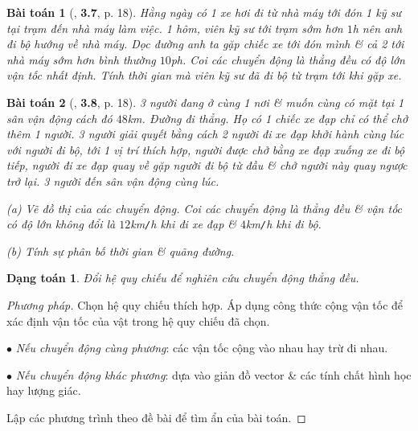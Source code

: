 \documentclass{article}
\numberwithin{equation}{section}
\newtheorem{dangtoan}{Dạng toán}[section]
\newtheorem{baitoan}{Bài toán}[section]
\begin{document}
\begin{baitoan}[\cite{Giai_Toan_Vat_Ly_10_tap_1}, \textbf{3.7}, p. 18]
	Hằng ngày có 1 xe hơi đi từ nhà máy tới đón 1 kỹ sư tại trạm đến nhà máy làm việc. 1 hôm, viên kỹ sư tới trạm sớm hơn $1$\emph{h} nên anh đi bộ hướng về nhà máy. Dọc đường anh ta gặp chiếc xe tới đón mình \& cả 2 tới nhà máy sớm hơn bình thường $10$\emph{ph}. Coi các chuyển động là thẳng đều có độ lớn vận tốc nhất định. Tính thời gian mà viên kỹ sư đã đi bộ từ trạm tới khi gặp xe.
\end{baitoan}

\begin{baitoan}[\cite{Giai_Toan_Vat_Ly_10_tap_1}, \textbf{3.8}, p. 18]
	3 người đang ở cùng 1 nơi \& muốn cùng có mặt tại 1 sân vận động cách đó $48$\emph{km}. Đường đi thẳng. Họ có 1 chiếc xe đạp chỉ có thể chở thêm 1 người. 3 người giải quyết bằng cách 2 người đi xe đạp khởi hành cùng lúc với người đi bộ, tới 1 vị trí thích hợp, người được chở bằng xe đạp xuống xe đi bộ tiếp, người đi xe đạp quay về gặp người đi bộ từ đầu \& chở người này quay ngược trở lại. 3 người đến sân vận động cùng lúc.
	\begin{enumerate*}
		\item[(a)] Vẽ đồ thị của các chuyển động. Coi các chuyển động là thẳng đều \& vận tốc có độ lớn không đổi là $12$\emph{km\texttt{/}h} khi đi xe đạp \& $4$\emph{km\texttt{/}h} khi đi bộ.
		\item[(b)] Tính sự phân bố thời gian \& quãng đường.
	\end{enumerate*}	
\end{baitoan}

\begin{dangtoan}
	Đổi hệ quy chiếu để nghiên cứu chuyển động thẳng đều.
\end{dangtoan}

\begin{proof}[Phương pháp]
	Chọn hệ quy chiếu thích hợp. Áp dụng công thức cộng vận tốc để xác định vận tốc của vật trong hệ quy chiếu đã chọn.
	\begin{enumerate*}
		\item[$\bullet$] \textit{Nếu chuyển động cùng phương}: các vận tốc cộng vào nhau hay trừ đi nhau.
		\item[$\bullet$] \textit{Nếu chuyển động khác phương}: dựa vào giản đồ vector \& các tính chất hình học hay lượng giác.
	\end{enumerate*}
	Lập các phương trình theo đề bài để tìm ẩn của bài toán.
\end{proof}
\end{document}
